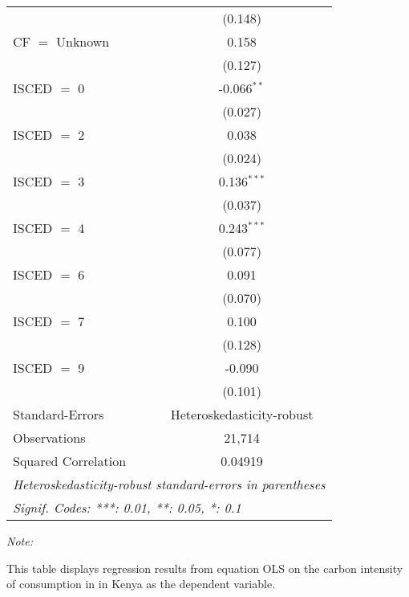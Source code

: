 \begin{table}[htbp!]
\begin{adjustbox}{width = 1\textwidth, max height = 0.95\textheight, center}
\begin{threeparttable}[b]
\begin{tabular}{lc}
                                & (0.148)\\   
            CF $=$ Unknown      & 0.158\\   
                                & (0.127)\\   
            ISCED $=$ 0         & -0.066$^{**}$\\   
                                & (0.027)\\   
            ISCED $=$ 2         & 0.038\\   
                                & (0.024)\\   
            ISCED $=$ 3         & 0.136$^{***}$\\   
                                & (0.037)\\   
            ISCED $=$ 4         & 0.243$^{***}$\\   
                                & (0.077)\\   
            ISCED $=$ 6         & 0.091\\   
                                & (0.070)\\   
            ISCED $=$ 7         & 0.100\\   
                                & (0.128)\\   
            ISCED $=$ 9         & -0.090\\   
                                & (0.101)\\   
            \midrule 
            Standard-Errors     & Heteroskedasticity-robust \\   
            Observations        & 21,714\\  
            Squared Correlation & 0.04919\\  
            \midrule \midrule
            \multicolumn{2}{l}{\emph{Heteroskedasticity-robust standard-errors in parentheses}}\\
            \multicolumn{2}{l}{\emph{Signif. Codes: ***: 0.01, **: 0.05, *: 0.1}}\\
         \end{tabular}
         
         \begin{tablenotes}\item \medskip \textit{Note:}
            \item This table displays regression results from equation OLS on the carbon intensity of consumption in  in Kenya as the dependent variable. 
         \end{tablenotes}
      \end{threeparttable}
   \end{adjustbox}
\end{table}


